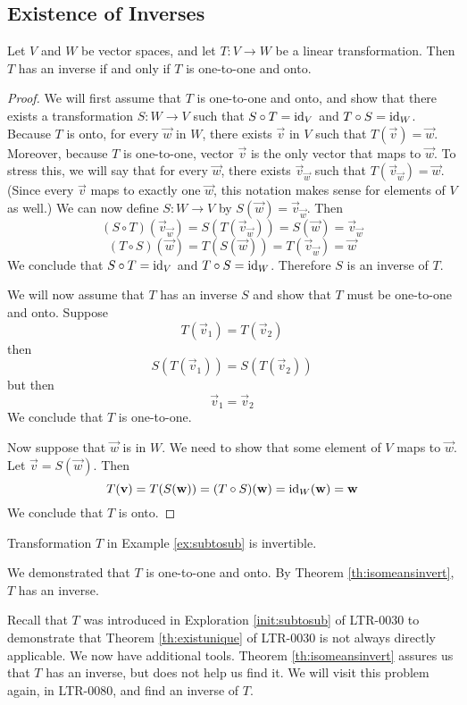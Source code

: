 \documentclass{ximera}
\begin{document}
\subsection*{Existence of Inverses}
\begin{theorem}\label{th:isomeansinvert} Let $V$ and $W$ be vector spaces, and let $T:V\rightarrow W$ be a linear transformation.  Then $T$ has an inverse if and only if $T$ is one-to-one and onto. 
\end{theorem}
\begin{proof}
We will first assume that $T$ is one-to-one and onto, and show that there exists a transformation $S:W\rightarrow V$ such that $S\circ T=\text{id}_V$ and $T\circ S=\text{id}_W$.  Because $T$ is onto, for every $\vec{w}$ in $W$, there exists $\vec{v}$ in $V$ such that $T(\vec{v})=\vec{w}$.  Moreover, because $T$ is one-to-one, vector $\vec{v}$ is the only vector that maps to $\vec{w}$.  To stress this, we will say that for every $\vec{w}$, there exists $\vec{v}_{\vec{w}}$ such that $T(\vec{v}_{\vec{w}})=\vec{w}$. (Since every $\vec{v}$ maps to exactly one $\vec{w}$, this notation makes sense for elements of $V$ as well.)  We can now define $S:W\rightarrow V$ by $S(\vec{w})=\vec{v}_{\vec{w}}$.
Then
$$(S\circ T)(\vec{v}_{\vec{w}})=S(T(\vec{v}_{\vec{w}}))=S(\vec{w})=\vec{v}_{\vec{w}}$$
$$(T\circ S)(\vec{w})=T(S(\vec{w}))=T(\vec{v}_{\vec{w}})=\vec{w}$$
We conclude that $S\circ T=\text{id}_V$ and $T\circ S=\text{id}_W$.  Therefore $S$ is an inverse of $T$.

We will now assume that $T$ has an inverse $S$ and show that $T$ must be one-to-one and onto.  
Suppose $$T(\vec{v}_1)=T(\vec{v}_2)$$ then $$S(T(\vec{v}_1))=S(T(\vec{v}_2))$$
but then
$$\vec{v}_1=\vec{v}_2$$
We conclude that $T$ is one-to-one.

Now suppose that $\vec{w}$ is in $W$.  We need to show that some element of $V$ maps to $\vec{w}$.  Let $\vec{v}=S(\vec{w})$.  Then
$$T(\mathbf{v})=T(S(\mathbf{w}))=(T\circ S)(\mathbf{w})=\text{id}_W(\mathbf{w})=\mathbf{w}$$
We conclude that $T$ is onto.
\end{proof}

\begin{example}\label{ex:subtosubinvert}
Transformation $T$ in Example \ref{ex:subtosub}  is invertible.
\begin{explanation}
We demonstrated that $T$ is one-to-one and onto.  By Theorem \ref{th:isomeansinvert}, $T$ has an inverse.  

Recall that $T$ was introduced in Exploration \ref {init:subtosub} of LTR-0030 to demonstrate that Theorem \ref{th:existunique} of LTR-0030 is not always directly applicable.  We now have additional tools. Theorem \ref{th:isomeansinvert} assures us that $T$ has an inverse, but does not help us find it. We will visit this problem again, in LTR-0080, and find an inverse of $T$.
\end{explanation}
\end{example}
\end{document}
